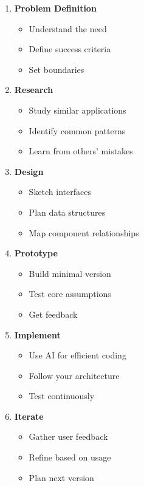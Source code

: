 \documentclass[
  letterpaper,
  DIV=11,
  numbers=noendperiod,
  oneside]{scrreprt}
\providecommand{\tightlist}{%
  \setlength{\itemsep}{0pt}\setlength{\parskip}{0pt}}\usepackage{longtable,booktabs,array}
\begin{document}
\begin{enumerate}
\def\labelenumi{\arabic{enumi}.}
\tightlist
\item
  \textbf{Problem Definition}

  \begin{itemize}
  \tightlist
  \item
    Understand the need
  \item
    Define success criteria
  \item
    Set boundaries
  \end{itemize}
\item
  \textbf{Research}

  \begin{itemize}
  \tightlist
  \item
    Study similar applications
  \item
    Identify common patterns
  \item
    Learn from others' mistakes
  \end{itemize}
\item
  \textbf{Design}

  \begin{itemize}
  \tightlist
  \item
    Sketch interfaces
  \item
    Plan data structures
  \item
    Map component relationships
  \end{itemize}
\item
  \textbf{Prototype}

  \begin{itemize}
  \tightlist
  \item
    Build minimal version
  \item
    Test core assumptions
  \item
    Get feedback
  \end{itemize}
\item
  \textbf{Implement}

  \begin{itemize}
  \tightlist
  \item
    Use AI for efficient coding
  \item
    Follow your architecture
  \item
    Test continuously
  \end{itemize}
\item
  \textbf{Iterate}

  \begin{itemize}
  \tightlist
  \item
    Gather user feedback
  \item
    Refine based on usage
  \item
    Plan next version
  \end{itemize}
\end{enumerate}
\end{document}
